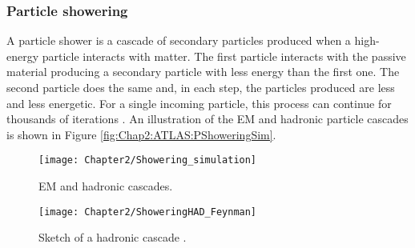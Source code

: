 

\subsubsection{Particle showering}
\label{sec:Chap2:CALO:Shower}


A particle shower is a cascade of secondary particles produced when a high-energy particle interacts with matter.
The first particle interacts with the passive material producing a secondary particle with less energy than the first one.
The second particle
does the same and, in each step, the particles produced are less and less energetic. For a single incoming particle, 
this process can continue for thousands of iterations \cite{grupen_shwartz_2008}. An illustration of the
EM and hadronic particle cascades is shown in Figure \ref{fig:Chap2:ATLAS:PShoweringSim}.

\begin{figure}
\centering
\begin{minipage}{.45\textwidth}
	\centering
 	 \texttt{[image: Chapter2/Showering\_simulation]}
	 \caption{EM and hadronic cascades.}
	\label{fig:Chap2:ATLAS:PShoweringSim}
\end{minipage}%
\begin{minipage}{.55\textwidth}
	\centering
 	 \texttt{[image: Chapter2/ShoweringHAD\_Feynman]}
	 \caption{Sketch of a hadronic cascade \cite{grupen_shwartz_2008}.}
	\label{fig:Chap2:ATLAS:PShowering}
\end{minipage}
\end{figure}


